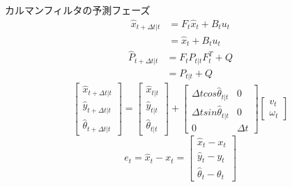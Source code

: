 \documentclass[a4paper]{article}
\begin{document}
カルマンフィルタの予測フェーズ
\begin{align}
    \hat{x}_{t+ \Delta t|t} &= F_{t} \hat{x}_{t} + B_{t} u_{t} \nonumber \\
                            &= \hat{x}_{t} + B_{t} u_{t}
    \label{eq:1}
\end{align}
%
%
\begin{align}
    \hat{P}_{t+ \Delta t|t} &= F_{t} P_{t|t} F_{t}^{T} + Q \nonumber \\
                            &= P_{t|t} + Q
    \label{eq:2}
\end{align}
%
%
\begin{equation}
    \begin{bmatrix}
    \hat{x}_{t+ \Delta t|t} \\
    \hat{y}_{t+ \Delta t|t} \\
    \hat{\theta}_{t+ \Delta t|t}
    \end{bmatrix} 
    =
    \begin{bmatrix}
        \hat{x}_{t|t} \\
        \hat{y}_{t|t} \\
        \hat{\theta}_{t|t}
    \end{bmatrix} 
    +
    \begin{bmatrix}
        \Delta t cos\hat{\theta}_{t|t} &0 \\
        \Delta t sin\hat{\theta}_{t|t} &0 \\
        0                              &{\Delta}t
    \end{bmatrix}
    \begin{bmatrix}
        v_{t} \\
        \omega_{t}
    \end{bmatrix}
    \label{eq:3} 
\end{equation}
%
%
\begin{equation}
    e_{t} = \hat{x}_{t} - x_{t} =
    \begin{bmatrix}
        \hat{x}_{t} - x_{t} \\
        \hat{y}_{t} - y_{t} \\
        \hat{\theta}_{t} - \theta_{t}
    \end{bmatrix}
    \label{eq:4}
\end{equation}
%
%
\end{document}
